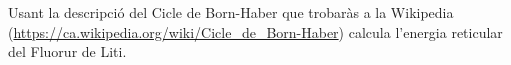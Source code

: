\begin{exr}
Usant la descripció del Cicle de Born-Haber que trobaràs a la Wikipedia (\url{https://ca.wikipedia.org/wiki/Cicle_de_Born-Haber}) calcula l'energia reticular del Fluorur de Liti.
\end{exr}